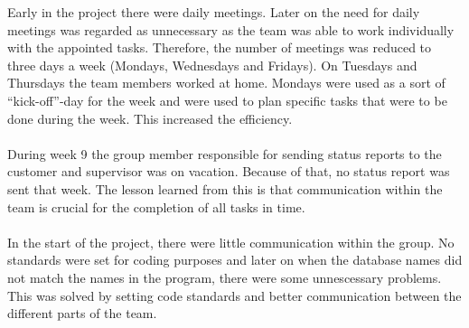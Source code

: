 Early in the project there were daily meetings. Later on the need for daily meetings was regarded as unnecessary as the team was able to work individually with the appointed tasks. Therefore, the number of meetings was reduced to three days a week (Mondays, Wednesdays and Fridays). On Tuesdays and Thursdays the team members worked at home. Mondays were used as a sort of “kick-off”-day for the week and were used to plan specific tasks that were to be done during the week. This increased the efficiency.\\
\\
During week 9 the group member responsible for sending status reports to the customer and supervisor was on vacation. Because of that, no status report was sent that week. The lesson learned from this is that communication within the team is crucial for the completion of all tasks in time.\\
\\
In the start of the project, there were little communication within the group. No standards were set
for coding purposes and later on when the database names did not match the names in the program, there were some unnescessary
problems. This was solved by setting code standards and better communication between the different 
parts of the team. 
